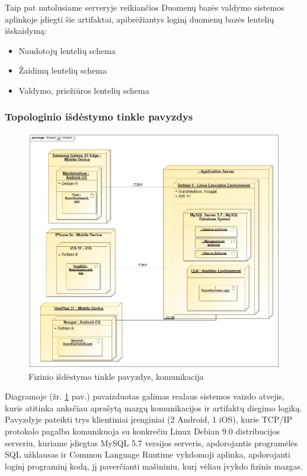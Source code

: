 \documentclass{VUMIFPSkursinis}
\begin{document}
			Taip pat nutolusiame serveryje veikiančios Duomenų bazės valdymo 				sistemos aplinkoje įdiegti šie artifaktai, apibrėžiantys loginį 			duomenų bazės lentelių išskaidymą:
  				\begin{itemize}
					\item Naudotojų lentelių schema
					\item Žaidimų lentelių schema
					\item Valdymo, priežiūros lentelių schema
				\end{itemize}
	\subsubsection{Topologinio išdėstymo tinkle pavyzdys}
				\begin{figure}[H]
				\centering
				\includegraphics[scale=0.4]{img/TopologyExample}
				\caption{Fizinio išdėstymo tinkle pavyzdys, komunikacija}
				\label{img:TopologyExample}
			\end{figure}
		Diagramoje (žr. \ref{img:TopologyExample} pav.) pavaizduotas galimas realaus sistemos vaizdo atvejis, kuris atitinka 		anksčiau aprašytą mazgų komunikacijos ir artifaktų diegimo logiką. Pavyzdyje 			pateikti trys klientiniai įrenginiai (2 Android, 1 iOS), kurie TCP/IP protokolo 		pagalba komunikuoja su konkrečiu Linux Debian 9.0 distribucijos serveriu, kuriame 			įdiegtas MySQL 5.7 versijos serveris, apdorojantis programėlės SQL užklausas ir 		Common Language Runtime vykdomoji aplinka, apdorojanti loginį programinį kodą, jį 			paverčianti mašininiu, kurį vėliau įvykdo fizinis mazgas.
\end{document}
